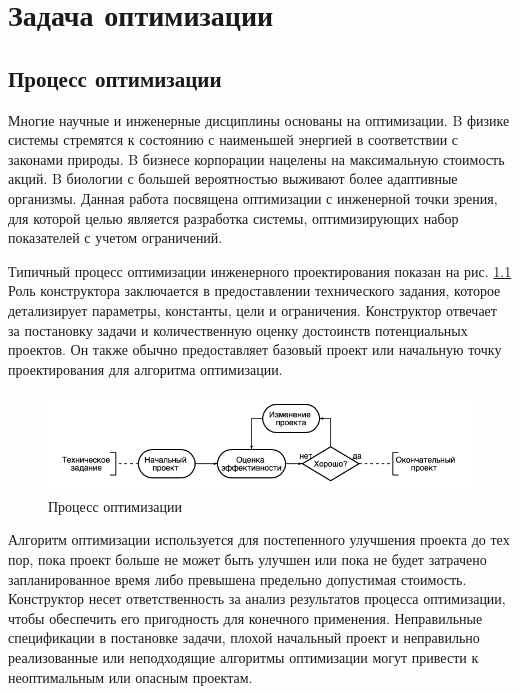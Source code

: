 \chapter{Задача оптимизации}
\label{ch:chapter2}

\section{Процесс оптимизации}

Многие научные и инженерные дисциплины основаны на оптимизации. B физике системы стремятся к состоянию с наименьшей энергией в соответствии с законами природы. B бизнесе корпорации нацелены на максимальную стоимость акций. B биологии с большей вероятностью выживают более адаптивные организмы. Данная работа посвящена оптимизации с инженерной точки зрения, для которой целью является разработка системы, оптимизирующих набор показателей с учетом ограничений.

Типичный процесс оптимизации инженерного проектирования показан на рис. \ref{fig:diagram_1} Роль конструктора заключается в предоставлении технического задания, которое детализирует параметры, константы, цели и ограничения. Конструктор отвечает за постановку задачи и количественную оценку достоинств потенциальных проектов. Он также обычно предоставляет базовый проект или начальную точку проектирования для алгоритма оптимизации.

\begin{figure}[ht]
 \centering
		\includegraphics[height = 3 cm, keepaspectratio]{../assets/images/1_1_1diagram.png}
		\caption{ Процесс оптимизации }
		\label{fig:diagram_1}
	\end{figure}

Алгоритм оптимизации используется для постепенного улучшения проекта до тех пор, пока проект больше не может быть улучшен или пока не будет затрачено запланированное время либо превышена предельно допустимая стоимость. Конструктор несет ответственность за анализ результатов процесса оптимизации, чтобы обеспечить его пригодность для конечного применения. Неправильные спецификации в постановке задачи, плохой начальный проект и неправильно реализованные или неподходящие алгоритмы оптимизации могут привести к неоптимальным или опасным проектам.

